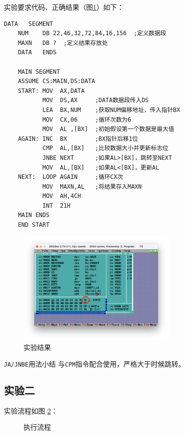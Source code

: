 \documentclass[11pt]{SEU-Digital-Report}
\begin{document}
实验要求代码、正确结果（图\ref{fig:rlt1}）如下：
\begin{lstlisting}[language={[x86masm]Assembler},title=exp31.asm]
    DATA   SEGMENT
    NUM    DB 22,46,32,72,84,16,156  ;定义数据段
    MAXN   DB ?  ;定义结果存放处
    DATA   ENDS

    MAIN SEGMENT 
    ASSUME CS:MAIN,DS:DATA
    START: MOV  AX,DATA
           MOV  DS,AX     ;DATA数据段传入DS
           LEA  BX,NUM    ;获取NUM偏移地址，传入指针BX
           MOV  CX,06     ;循环次数为6
           MOV  AL ,[BX]  ;初始假设第一个数据是最大值
    AGAIN: INC  BX        ;BX指针后移1位
           CMP  AL,[BX]   ;比较数据大小并更新标志位
           JNBE NEXT      ;如果AL>[BX]，跳转至NEXT
           MOV  AL,[BX]   ;如果AL<[BX]，更新AL
    NEXT:  LOOP AGAIN     ;循环CX次
           MOV  MAXN,AL   ;将结果存入MAXN
           MOV  AH,4CH
           INT  21H
    MAIN ENDS
    END START
\end{lstlisting}

\begin{figure}[htbp]
    \centering
    \includegraphics[width=0.7\textwidth]{fig/rlt1.png}
    \caption{实验结果}
    \label{fig:rlt1}
\end{figure}

\begin{note}{\texttt{JA/JNBE}用法小结}{}
    与\texttt{CPM}指令配合使用，严格大于时候跳转。
\end{note}

\subsection{实验二}
实验流程如图 \ref{fig:exp32}：
\begin{figure}[hbpt]
    \centering
    
    \caption{执行流程}
    \label{fig:exp32}
\end{figure}
\end{document}
